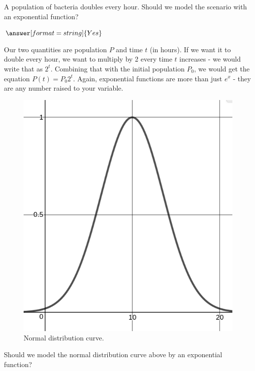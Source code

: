 \documentclass{ximera}
\begin{document}
\begin{question}
	A population of bacteria doubles every hour. Should we model the scenario with an exponential function?
	
	$\answer[format=string]{Yes}$
	
	\begin{feedback}
		Our two quantities are population $P$ and time $t$ (in hours). If we want it to double every hour, we want to multiply by 2 every time $t$ increases - we would write that as $2^t$. Combining that with the initial population $P_0$, we would get the equation $P(t) = P_0 2^t$. Again, exponential functions are more than just $e^x$ - they are any number raised to your variable.
	\end{feedback}
\end{question}

\begin{question}

\begin{figure}
	\includegraphics[scale=0.3]{expSquared.png}
	\caption{Normal distribution curve.}
\end{figure}

Should we model the normal distribution curve above by an exponential function?


\end{question}
\end{document}
